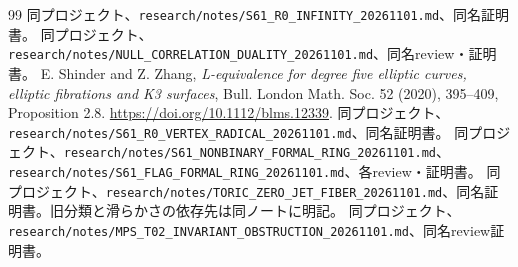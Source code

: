 \documentclass[11pt,a4paper]{ltjsarticle}
\theoremstyle{remark}
\begin{document}
\begin{thebibliography}{99}
 同プロジェクト、\nolinkurl{research/notes/S61_R0_INFINITY_20261101.md}、同名証明書。
 同プロジェクト、\nolinkurl{research/notes/NULL_CORRELATION_DUALITY_20261101.md}、同名review・証明書。
 E. Shinder and Z. Zhang, \textit{L-equivalence for degree five elliptic curves, elliptic fibrations and K3 surfaces}, Bull. London Math. Soc. 52 (2020), 395--409, Proposition 2.8. \url{https://doi.org/10.1112/blms.12339}.
 同プロジェクト、\nolinkurl{research/notes/S61_R0_VERTEX_RADICAL_20261101.md}、同名証明書。
 同プロジェクト、\nolinkurl{research/notes/S61_NONBINARY_FORMAL_RING_20261101.md}、\nolinkurl{research/notes/S61_FLAG_FORMAL_RING_20261101.md}、各review・証明書。
 同プロジェクト、\nolinkurl{research/notes/TORIC_ZERO_JET_FIBER_20261101.md}、同名証明書。旧分類と滑らかさの依存先は同ノートに明記。
 同プロジェクト、\nolinkurl{research/notes/MPS_T02_INVARIANT_OBSTRUCTION_20261101.md}、同名review証明書。


\end{thebibliography}
\end{document}
